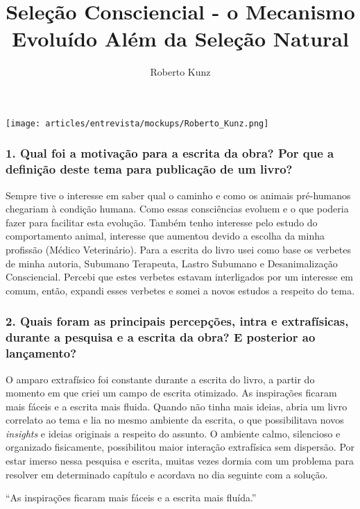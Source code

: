 \documentclass{gescons}
\author{Roberto Kunz}
\title{Seleção Consciencial - o Mecanismo Evoluído Além da Seleção Natural}
\begin{document}
    \makeentrevistatitle

    \begin{multicols}{2}

\begin{center}
    \texttt{[image: articles/entrevista/mockups/Roberto\_Kunz.png]}
\end{center}


\subsubsection{1. Qual foi a motivação para a escrita da obra? Por que a definição deste tema para publicação de um livro?}

Sempre tive o interesse em saber qual o caminho e como os animais pré-humanos chegariam à condição humana. Como essas consciências evoluem e o que poderia fazer para facilitar esta evolução. Também tenho interesse pelo estudo do comportamento animal, interesse que aumentou devido a escolha da minha profissão (Médico Veterinário). Para a escrita do livro usei como base os verbetes de minha autoria, Subumano Terapeuta, Lastro Subumano e Desanimalização Consciencial. Percebi que estes verbetes estavam interligados por um interesse em comum, então, expandi esses verbetes e somei a novos estudos a respeito do tema.

\subsubsection{2. Quais foram as principais percepções, intra e extrafísicas, durante a pesquisa e a escrita da obra? E posterior ao lançamento?}

O amparo extrafísico foi constante durante a escrita do livro, a partir do momento em que criei um campo de escrita otimizado. As inspirações ficaram mais fáceis e a escrita mais fluida. Quando não tinha mais ideias, abria um livro correlato ao tema e lia no mesmo ambiente da escrita, o que possibilitava novos \emph{insights} e ideias originais a respeito do assunto. O ambiente calmo, silencioso e organizado fisicamente, possibilitou maior interação extrafísica sem dispersão. Por estar imerso nessa pesquisa e escrita, muitas vezes dormia com um problema para resolver em determinado capítulo e acordava no dia seguinte com a solução.

\begin{pullquote}
    ``As inspirações ficaram mais fáceis e a escrita mais fluída.''
\end{pullquote}


\end{multicols}
\end{document}
